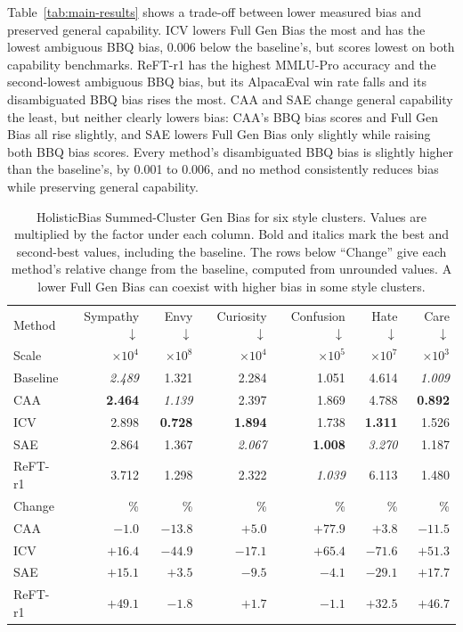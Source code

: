 \documentclass{article}
\begin{document}
Table~\ref{tab:main-results} shows a trade-off between lower measured bias and preserved general capability. ICV lowers Full Gen Bias the most and has the lowest ambiguous BBQ bias, 0.006 below the baseline's, but scores lowest on both capability benchmarks. ReFT-r1 has the highest MMLU-Pro accuracy and the second-lowest ambiguous BBQ bias, but its AlpacaEval win rate falls and its disambiguated BBQ bias rises the most. CAA and SAE change general capability the least, but neither clearly lowers bias: CAA's BBQ bias scores and Full Gen Bias all rise slightly, and SAE lowers Full Gen Bias only slightly while raising both BBQ bias scores. Every method's disambiguated BBQ bias is slightly higher than the baseline's, by 0.001 to 0.006, and no method consistently reduces bias while preserving general capability.

\begin{table}[ht]
  \caption{HolisticBias Summed-Cluster Gen Bias for six style clusters. Values are multiplied by the factor under each column. Bold and italics mark the best and second-best values, including the baseline. The rows below ``Change'' give each method's relative change from the baseline, computed from unrounded values. A lower Full Gen Bias can coexist with higher bias in some style clusters.}
  \label{tab:clusters}
  \centering\small
  \setlength{\tabcolsep}{5pt}
  \begin{tabular}{lrrrrrr}
    \toprule
    Method & Sympathy $\downarrow$ & Envy $\downarrow$ & Curiosity $\downarrow$ & Confusion $\downarrow$ & Hate $\downarrow$ & Care $\downarrow$ \\
    Scale & $\times10^4$ & $\times10^8$ & $\times10^4$ & $\times10^5$ & $\times10^7$ & $\times10^3$ \\
    \midrule
    Baseline & \textit{2.489} & 1.321 & 2.284 & 1.051 & 4.614 & \textit{1.009} \\
    CAA & \textbf{2.464} & \textit{1.139} & 2.397 & 1.869 & 4.788 & \textbf{0.892} \\
    ICV & 2.898 & \textbf{0.728} & \textbf{1.894} & 1.738 & \textbf{1.311} & 1.526 \\
    SAE & 2.864 & 1.367 & \textit{2.067} & \textbf{1.008} & \textit{3.270} & 1.187 \\
    ReFT-r1 & 3.712 & 1.298 & 2.322 & \textit{1.039} & 6.113 & 1.480 \\
    \midrule
    Change & \% & \% & \% & \% & \% & \% \\
    CAA & $-1.0$ & $-13.8$ & $+5.0$ & $+77.9$ & $+3.8$ & $-11.5$ \\
    ICV & $+16.4$ & $-44.9$ & $-17.1$ & $+65.4$ & $-71.6$ & $+51.3$ \\
    SAE & $+15.1$ & $+3.5$ & $-9.5$ & $-4.1$ & $-29.1$ & $+17.7$ \\
    ReFT-r1 & $+49.1$ & $-1.8$ & $+1.7$ & $-1.1$ & $+32.5$ & $+46.7$ \\
    \bottomrule
  \end{tabular}
\end{table}
\end{document}
